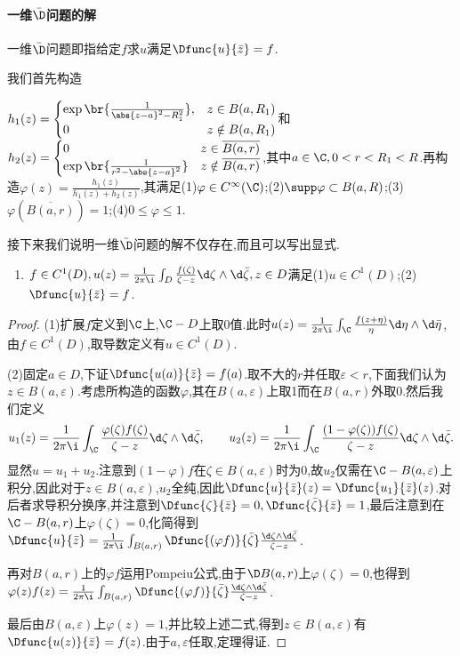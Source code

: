 \documentclass{article}
\begin{document}
\dayhrule
\paragraph{一维$\bar{\D}$问题的解}\label{para:一维dbar问题的解}
一维$\bar{\D}$问题即指给定$f$求$u$满足$\Dfunc{u}{\bar{z}}=f$.

\hypertarget{dbar-func}{我们首先构造}$h_1(z)=\begin{cases}
    \exp\br{\frac{1}{\abs{z-a}^2-R_1^2}},&z\in B(a,R_1)\\0&z\notin B(a,R_1)
\end{cases}$和$h_2(z)=\begin{cases}
    0&z\in \overline{B(a,r)}\\\exp\br{\frac{1}{r^2-\abs{z-a}^2}}&z\notin \overline{B(a,r)}
\end{cases}$,其中$a\in\C,0<r<R_1<R$.再构造$\varphi(z)=\frac{h_1(z)}{h_1(z)+h_2(z)}$,其满足(1)$\varphi\in C^\infty(\C)$;(2)$\supp\varphi\subset B(a,R)$;(3)$\varphi(\overline{B(a,r)})=1$;(4)$0\leq \varphi\leq 1$.

接下来我们说明一维$\bar{\D}$问题的解不仅存在,而且可以写出显式.
\begin{enumerate}[resume]
    \item $f\in C^1(D),u(z)=\frac{1}{2\pi\i}\int_D \frac{f(\zeta)}{\zeta-z}\d\zeta\wedge\d\bar{\zeta},z\in D$满足(1)$u\in C^1(D)$;(2)$\Dfunc{u}{\bar{z}}=f$.
\end{enumerate}

\begin{proof}
    (1)扩展$f$定义到$\C$上,$\C-D$上取0值.此时$u(z)=\frac{1}{2\pi\i}\int_\C\frac{f(z+\eta)}{\eta}\d\eta\wedge\d\bar{\eta}$,由$f\in C^1(D)$,取导数定义有$u\in C^1(D)$.

    (2)固定$a\in D$,下证$\Dfunc{u(a)}{\bar{z}}=f(a)$.取不大的$r$并任取$\varepsilon<r$,下面我们认为$z\in B(a,\varepsilon)$.考虑所构造的函数$\varphi$,其在$B(a,\varepsilon)$上取1而在$B(a,r)$外取0.然后我们定义
    $$u_1(z)=\frac{1}{2\pi\i}\int_\C\frac{\varphi(\zeta)f(\zeta)}{\zeta-z}\d\zeta\wedge\d\bar{\zeta},\qquad u_2(z)=\frac{1}{2\pi\i}\int_\C \frac{(1-\varphi(\zeta))f(\zeta)}{\zeta-z}\d\zeta\wedge\d\bar{\zeta}.$$
    显然$u=u_1+u_2$.注意到$(1-\varphi)f$在$\zeta\in B(a,\varepsilon)$时为0,故$u_2$仅需在$\C-B(a,\varepsilon)$上积分,因此对于$z\in B(a,\varepsilon)$,$u_2$全纯,因此$\Dfunc{u}{\bar{z}}(z)=\Dfunc{u_1}{\bar{z}}(z)$.对后者求导积分换序,并注意到$\Dfunc{\zeta}{\bar{z}}=0,\Dfunc{\bar{\zeta}}{\bar{z}}=1$,最后注意到在$\C-B(a,r)$上$\varphi(\zeta)=0$,化简得到$\Dfunc{u}{\bar{z}}=\frac{1}{2\pi\i}\int_{B(a,r)}\Dfunc{(\varphi f)}{\bar{\zeta}}\frac{\d\zeta\wedge\d\bar{\zeta}}{\zeta-z}$.

    再对$B(a,r)$上的$\varphi f$运用Pompeiu公式,由于$\D B(a,r)$上$\varphi(\zeta)=0$,也得到$\varphi(z)f(z)=\frac{1}{2\pi\i}\int_{B(a,r)}\Dfunc{(\varphi f)}{\bar{\zeta}}\frac{\d\zeta\wedge\d\bar{\zeta}}{\zeta-z}$.

    最后由$B(a,\varepsilon)$上$\varphi(z)=1$,并比较上述二式,得到$z\in B(a,\varepsilon)$有$\Dfunc{u(z)}{\bar{z}}=f(z)$.由于$a,\varepsilon$任取,定理得证.
\end{proof}
\end{document}
